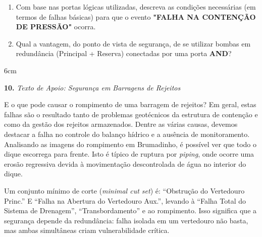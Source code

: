 \documentclass[12pt,a4paper]{report}
\begin{document}
\begin{enumerate}[label=\alph*)]
  \item Com base nas portas lógicas utilizadas, descreva as condições necessárias (em termos de falhas básicas) para que o evento \textbf{"FALHA NA CONTENÇÃO DE PRESSÃO"} ocorra.
  \item Qual a vantagem, do ponto de vista de segurança, de se utilizar bombas em redundância (Principal + Reserva) conectadas por uma porta \textbf{AND}?
\end{enumerate}
\begin{resposta}{6cm}
\end{resposta}

\vspace{0.5cm}

\textbf{10.} \textit{Texto de Apoio: Seguran\c{c}a em Barragens de Rejeitos}

E o que pode causar o rompimento de uma barragem de rejeitos? Em geral, estas falhas s\~ao o resultado tanto de problemas geot\'ecnicos da estrutura de conten\c{c}\~ao e como da gest\~ao dos rejeitos armazenados. Dentre as v\'arias causas, devemos destacar a falha no controle do balan\c{c}o h\'idrico e a aus\^encia de monitoramento. Analisando as imagens do rompimento em Brumadinho, \'e poss\'ivel ver que todo o dique escorrega para frente. Isto \'e t\'ipico de ruptura por \textit{piping}, onde ocorre uma eros\~ao regressiva devida \`a movimenta\c{c}\~ao descontrolada de \'agua no interior do dique. 

Um conjunto m\'inimo de corte (\textit{minimal cut set}) \'e: ``Obstru\c{c}\~ao do Vertedouro Princ.'' E ``Falha na Abertura do Vertedouro Aux.'', levando \`a ``Falha Total do Sistema de Drenagem'', ``Transbordamento'' e ao rompimento. Isso significa que a seguran\c{c}a depende da redund\^ancia: falha isolada em um vertedouro n\~ao basta, mas ambas simult\^aneas criam vulnerabilidade cr\'itica.

\small{}
\end{document}
